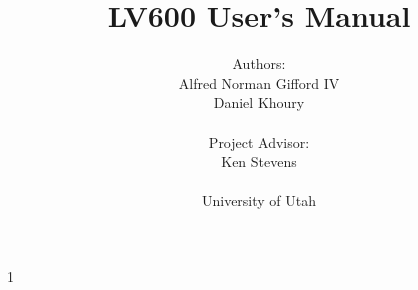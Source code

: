 \documentclass[letterpaper, 12 pt]{report}
\begin{document}
\title{LV600 User's Manual}
\author{Authors: \\ Alfred Norman Gifford IV \\ Daniel Khoury \\ \\ Project Advisor: \\ Ken Stevens \\ \\ University of Utah}
\maketitle
\pagestyle{empty}

\tableofcontents
\newpage

1












%

\end{document}
